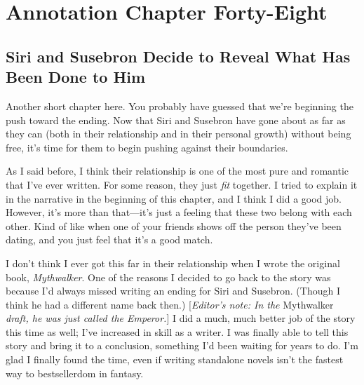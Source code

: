 \section{Annotation Chapter Forty-Eight}

\subsection*{Siri and Susebron Decide to Reveal What Has Been Done to Him}

Another short chapter here. You probably have guessed that we’re beginning the push toward the ending. Now that Siri and Susebron have gone about as far as they can (both in their relationship and in their personal growth) without being free, it’s time for them to begin pushing against their boundaries.

As I said before, I think their relationship is one of the most pure and romantic that I’ve ever written. For some reason, they just \textit{fit} together. I tried to explain it in the narrative in the beginning of this chapter, and I think I did a good job. However, it’s more than that—it’s just a feeling that these two belong with each other. Kind of like when one of your friends shows off the person they’ve been dating, and you just feel that it’s a good match.

I don’t think I ever got this far in their relationship when I wrote the original book, \textit{Mythwalker}. One of the reasons I decided to go back to the story was because I’d always missed writing an ending for Siri and Susebron. (Though I think he had a different name back then.) [\textit{Editor’s note: In the }Mythwalker\textit{ draft, he was just called the Emperor.}] I did a much, much better job of the story this time as well; I’ve increased in skill as a writer. I was finally able to tell this story and bring it to a conclusion, something I’d been waiting for years to do. I’m glad I finally found the time, even if writing standalone novels isn’t the fastest way to bestsellerdom in fantasy.



